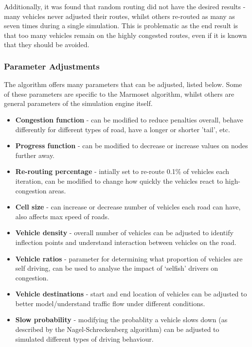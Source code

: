 \documentclass[ %
                    author={Alexander Hill},
                supervisor={Dr. Benjamin Sach},
                    degree={MEng},
                     title={MARMOSET},
                  subtitle={Multi-Agent Route Management using Online Simulation for Efficient Transportation},
                      type={research},
                      year={2016} ]{dissertation}
\begin{document}
Additionally, it was found that random routing did not have the desired results
- many vehicles never adjusted their routes, whilst others re-routed as many as
seven times during a single simulation. This is problematic as the end result is
that too many vehicles remain on the highly congested routes, even if it is
known that they should be avoided.

\subsubsection{Parameter Adjustments}

The algorithm offers many parameters that can be adjusted, listed below. Some of
these parameters are specific to the Marmoset algorithm, whilst others are
general parameters of the simulation engine itself.

\begin{itemize}
    \item \textbf{Congestion function} - can be modified to reduce penalties overall,
        behave differently for different types of road, have a longer or shorter
        'tail', etc.
    \item \textbf{Progress function} - can be modified to decrease or increase
        values on nodes further away.
    \item \textbf{Re-routing percentage} - intially set to re-route 0.1\% of
        vehicles each iteration, can be modified to change how quickly the
        vehicles react to high-congestion areas.
    \item \textbf{Cell size} - can increase or decrease number of vehicles each
    road can have, also affects max speed of roads.
    \item \textbf{Vehicle density} - overall number of vehicles can be adjusted
        to identify inflection points and understand interaction between
        vehicles on the road.
    \item \textbf{Vehicle ratios} - parameter for determining what proportion of
        vehicles are self driving, can be used to analyse the impact of
        `selfish' drivers on congestion.
    \item \textbf{Vehicle destinations} - start and end location of vehicles can
        be adjusted to better model/understand traffic flow under different
        conditions.
    \item \textbf{Slow probability} - modifying the probablity a vehicle slows
        down (as described by the Nagel-Schreckenberg algorithm) can be adjusted
        to simulated different types of driving behaviour.
\end{itemize}
\end{document}
